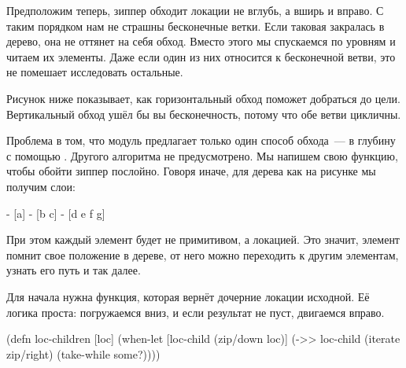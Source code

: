 \begin{figure}[H]
  \centering
  
  \label{fig:chart-zip-20}
\end{figure}

Предположим теперь, зиппер обходит локации не вглубь, а вширь и вправо. С таким
порядком нам не страшны бесконечные ветки. Если таковая закралась в дерево, она
не оттянет на себя обход. Вместо этого мы спускаемся по уровням и читаем их
элементы. Даже если один из них относится к бесконечной ветви, это не помешает
исследовать остальные.

Рисунок ниже показывает, как горизонтальный обход поможет добраться до
цели. Вертикальный обход ушёл бы вы бесконечность, потому что обе ветви
цикличны.

\begin{figure}[H]
  \centering
  
  \label{fig:chart-zip-21}
\end{figure}


Проблема в том, что модуль  предлагает только один способ
обхода~--- в глубину с помощью . Другого алгоритма не
предусмотрено. Мы напишем свою функцию, чтобы обойти зиппер послойно. Говоря
иначе, для дерева как на рисунке мы получим слои:

\begin{figure}[H]
  \centering
  
  \label{fig:chart-zip-22}
\end{figure}


\begin{english}
  \begin{text}
- [a]
- [b c]
- [d e f g]
  \end{text}
\end{english}

При этом каждый элемент будет не примитивом, а локацией. Это значит, элемент
помнит свое положение в дереве, от него можно переходить к другим элементам,
узнать его путь и так далее.

Для начала нужна функция, которая вернёт дочерние локации исходной. Её логика
проста: погружаемся вниз, и если результат не пуст, двигаемся вправо.

\begin{english}
  \begin{clojure}
(defn loc-children [loc]
  (when-let [loc-child (zip/down loc)]
    (->> loc-child
         (iterate zip/right)
         (take-while some?))))
  \end{clojure}
\end{english}

